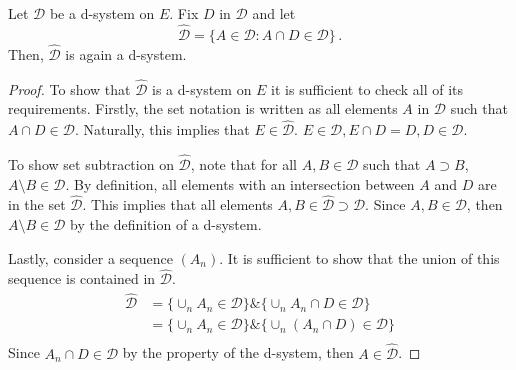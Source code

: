 \begin{definition}
	Let $\mathcal{D}$ be a d-system on $E$. Fix $D$ in $\mathcal{D}$ and let 
	\begin{equation}
		\hat{\mathcal{D}} = \{A\in \mathcal{D}: A\cap D \in \mathcal{D}\}\,.
	\end{equation}
	Then, $\hat{\mathcal{D}}$ is again a d-system.
\end{definition}
\begin{proof}
	To show that $\hat{\mathcal{D}}$ is a d-system on $E$ it is sufficient to check all of its requirements. Firstly, the set notation is written as all elements $A$ in $\mathcal{D}$ such that $A \cap D \in \mathcal{D}$. Naturally, this implies that $E \in \hat{\mathcal{D}}$. $E\in \mathcal{D}, E\cap D = D, D \in \mathcal{D}$.
	
	To show set subtraction on $\hat{\mathcal{D}}$, note that for all $A,B \in \mathcal{D}$ such that $A\supset B$, $A\setminus B \in \mathcal{D}$. By definition, all elements with an intersection between $A$ and $D$ are in the set $\hat{\mathcal{D}}$. This implies that all elements $A,B \in \hat{\mathcal{D}} \supset \mathcal{D}$. Since $A,B \in \mathcal{D}$, then $A\setminus B \in \mathcal{D}$ by the definition of a d-system.

	Lastly, consider a sequence $(A_n)$. It is sufficient to show that the union of this sequence is contained in $\hat{\mathcal{D}}$. 
	\begin{align*}
		\hat{\mathcal{D}} &= \{\cup_nA_n \in \mathcal{D}\} \& \{\cup_nA_n \cap D \in \mathcal{D}\} \\
		&= \{\cup_nA_n \in \mathcal{D}\} \& \{\cup_n(A_n \cap D) \in \mathcal{D}\} \\
	\end{align*}
	Since $A_n \cap D \in \mathcal{D}$ by the property of the d-system, then $A\in \hat{\mathcal{D}}$.
\end{proof}


